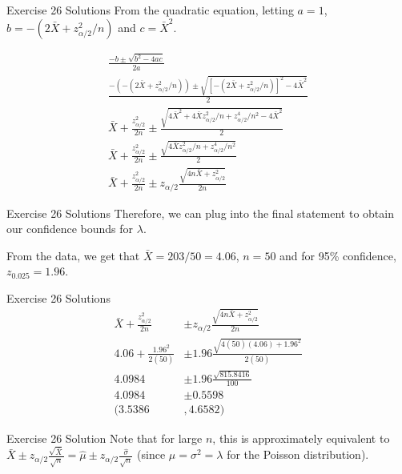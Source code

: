 \documentclass[
  ignorenonframetext,
]{beamer}
\begin{document}
\begin{frame}{Exercise 26 Solutions}
\protect\hypertarget{exercise-26-solutions-1}{}
From the quadratic equation, letting \(a = 1\),
\(b = -(2\bar{X} + z^{2}_{\alpha/2}/n)\) and \(c = \bar{X}^{2}\).

\[
\begin{aligned}
\frac{-b \pm \sqrt{b^{2} - 4ac}}{2a} \\
\frac{-(-(2\bar{X} + z^{2}_{\alpha/2}/n)) \pm \sqrt{[-(2\bar{X} + z^{2}_{\alpha/2}/n)]^{2} - 4\bar{X}^{2}}}{2} \\
\bar{X} + \frac{z^{2}_{\alpha/2}}{2n} \pm \frac{\sqrt{4\bar{X}^{2} + 4\bar{X}z_{\alpha/2}^{2}/n + z_{\alpha/2}^{4}/n^{2} - 4\bar{X}^{2}}}{2} \\
\bar{X} + \frac{z^{2}_{\alpha/2}}{2n} \pm \frac{\sqrt{4\bar{X}z_{\alpha/2}^{2}/n + z_{\alpha/2}^{4}/n^{2}}}{2} \\
\bar{X} + \frac{z^{2}_{\alpha/2}}{2n} \pm z_{\alpha/2}\frac{\sqrt{4n\bar{X} + z_{\alpha/2}^{2}}}{2n} 
\end{aligned}
\]
\end{frame}

\begin{frame}{Exercise 26 Solutions}
\protect\hypertarget{exercise-26-solutions-2}{}
Therefore, we can plug into the final statement to obtain our confidence
bounds for \(\lambda\).

From the data, we get that \(\bar{X} = 203/50 = 4.06\), \(n=50\) and for
95\% confidence, \(z_{0.025} = 1.96\).
\end{frame}

\begin{frame}{Exercise 26 Solutions}
\protect\hypertarget{exercise-26-solutions-3}{}
\[
\begin{aligned}
\bar{X} + \frac{z^{2}_{\alpha/2}}{2n} &\pm z_{\alpha/2}\frac{\sqrt{4n\bar{X} + z_{\alpha/2}^{2}}}{2n} \\
4.06 + \frac{1.96^{2}}{2(50)} &\pm 1.96\frac{\sqrt{4(50)(4.06) + 1.96^{2}}}{2(50)} \\
4.0984 &\pm 1.96\frac{\sqrt{815.8416}}{100} \\
4.0984 &\pm 0.5598\\
(3.5386&, 4.6582)
\end{aligned}
\]
\end{frame}

\begin{frame}{Exercise 26 Solution}
\protect\hypertarget{exercise-26-solution}{}
Note that for large \(n\), this is approximately equivalent to
\(\bar{X} \pm z_{\alpha/2}\frac{\sqrt{\bar{X}}}{\sqrt{n}} = \hat{\mu} \pm z_{\alpha/2}\frac{\hat{\sigma}}{\sqrt{n}}\)
(since \(\mu= \sigma^{2} = \lambda\) for the Poisson distribution).
\end{frame}
\end{document}
